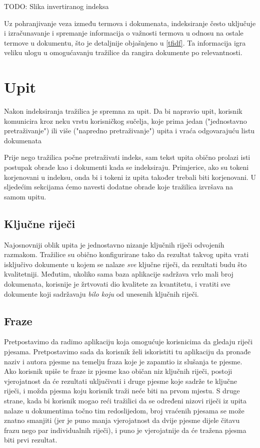 \documentclass[11pt]{scrreprt}
\begin{document}
TODO: Slika invertiranog indeksa

Uz pohranjivanje veza između termova i dokumenata, indeksiranje često uključuje i izračunavanje i spremanje informacija o važnosti termova u odnosu na ostale termove u dokumentu, što je detaljnije objašnjeno u \ref{tfidf}. Ta informacija igra veliku ulogu u omogućavanju tražilice da rangira dokumente po relevantnosti.

\chapter{Upit}

Nakon indeksiranja tražilica je spremna za upit. Da bi napravio upit, korisnik komunicira kroz neku vrstu korisničkog sučelja, koje prima jedan ("jednostavno pretraživanje") ili više ("napredno pretraživanje") upita i vraća odgovarajuću listu dokumenata

Prije nego tražilica počne pretraživati indeks, sam tekst upita obično prolazi isti postupak obrade kao i dokumenti kada se indeksiraju. Primjerice, ako su tokeni korjenovani u indeksu, onda bi i tokeni iz upita također trebali biti korjenovani. U sljedećim sekcijama ćemo navesti dodatne obrade koje tražilica izvršava na samom upitu.

\section{Ključne riječi}

Najosnovniji oblik upita je jednostavno nizanje ključnih riječi odvojenih razmakom. Tražilice su obično konfigurirane tako da rezultat takvog upita vrati isključivo dokumente u kojem se nalaze \textit{sve} ključne riječi, da rezultati budu što kvalitetniji. Međutim, ukoliko sama baza aplikacije sadržava vrlo mali broj dokumenata, korisnije je žrtvovati dio kvalitete za kvantitetu, i vratiti sve dokumente koji sadržavaju \textit{bilo koju} od unesenih ključnih riječi.

\section{Fraze}

Pretpostavimo da radimo aplikaciju koja omogućuje korisnicima da gledaju riječi pjesama. Pretpostavimo sada da korisnik želi iskoristiti tu aplikaciju da pronađe naziv i autora pjesme na temelju fraza koje je zapamtio iz slušanja te pjesme. Ako korisnik upiše te fraze iz pjesme kao običan niz ključnih riječi, postoji vjerojatnost da će rezultati uključivati i druge pjesme koje sadrže te ključne riječi, i možda pjesma koju korisnik traži neće biti na prvom mjestu. S druge strane, kada bi korisnik mogao reći tražilici da se određeni nizovi riječi iz upita nalaze u dokumentima točno tim redoslijedom, broj vraćenih pjesama se može znatno smanjiti (jer je puno manja vjerojatnost da dvije pjesme dijele čitavu frazu nego par individualnih riječi), i puno je vjerojatnije da će tražena pjesma biti prvi rezultat.
\end{document}
